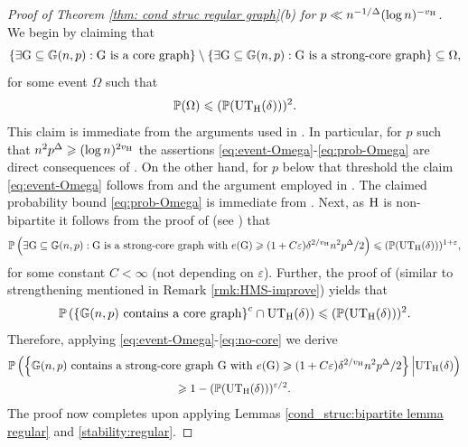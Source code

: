 \documentclass[a4paper,11pt,english,reqno]{amsart}
\numberwithin{equation}{section}
\renewcommand{\leq}{\leqslant}
\renewcommand{\geq}{\geqslant}
\newcommand{\UTH}{\textup{UT}_{\textup{H}}(\delta)}
\newcommand{\uH}{\textup{H}}
\renewcommand{\P}{\mathbb{P}}
\newcommand{\G}{\mathbb{G}}
\newcommand{\tu}[1]{\textup{#1}}
\begin{document}
\begin{proof}[Proof of Theorem \ref{thm: cond struc regular graph}(b) for $p \ll n^{-1/\Delta} (\log n)^{-v_{\uH}}$]
We begin by claiming that
\begin{equation}\label{eq:event-Omega}
	\left\{ \exists \tu{G} \subseteq \G(n,p): \tu{G} \text{ is a core graph} \right\}\setminus \left\{ \exists \tu{G} \subseteq \G(n,p): \tu{G} \text{ is a strong-core graph} \right\} \subseteq \Omega,
\end{equation}
for some event $\Omega$ such that 
\begin{equation}\label{eq:prob-Omega}
	\P(\Omega) \leq (\P(\UTH))^2.
\end{equation}
This claim is immediate from the arguments used in \cite[Sections 3.1--3.3]{ABRB}. In particular, for $p$ such that $n^2p^\Delta \geq (\log n)^{2 v_{\uH}}$ the assertions \eqref{eq:event-Omega}-\eqref{eq:prob-Omega} are direct consequences of \cite[Lemma 3.5]{ABRB}. On the other hand, for $p$ below that threshold the claim \eqref{eq:event-Omega} follows from \cite[Eqn.~(3.22)]{ABRB} and the argument employed in \cite[p.~32]{ABRB}. The claimed probability bound \eqref{eq:prob-Omega} is immediate from \cite[Lemmas 3.7, 3.8, 3.10, and 3.11]{ABRB}. Next, as $\uH$ is non-bipartite it follows from the proof of \cite[Proposition 3.3]{ABRB} (see \cite[Section 4.1]{ABRB}) that 
\begin{equation}\label{eq:sc-many-edge}
	\P\left(\exists \tu{G} \subseteq \G(n,p): \tu{G} \text{ is a strong-core graph with } e(\tu{G}) \geq (1+C \varepsilon)\delta^{2/v_{\uH}}n^2p^\Delta/2 \right) \leq (\P(\UTH))^{1+\varepsilon},
\end{equation}
for some constant $C < \infty$ (not depending on $\varepsilon$). Further, the proof of \cite[Lemma 3.2]{ABRB} (similar to strengthening mentioned in Remark \ref{rmk:HMS-improve}) yields that
\begin{equation}\label{eq:no-core}
	\P\left(\left\{\G(n,p) \text{ contains a core graph}\right\}^c \cap \UTH \right) \leq (\P(\UTH))^2. 
\end{equation}
Therefore, applying \eqref{eq:event-Omega}-\eqref{eq:no-core} we derive
\begin{multline*}
	\P\left(\left\{ \G(n,p) \text{ contains a strong-core graph } \tu{G}  \text{ with } e(\tu{G}) \geq (1+C \varepsilon)\delta^{2/v_{\uH}}n^2p^\Delta/2\right\}\Big| \UTH \right) \\
	\geq 1 - (\P(\UTH))^{\varepsilon/2}.
\end{multline*}
The proof now completes upon applying Lemmas \ref{cond_struc:bipartite lemma regular} and \ref{stability:regular}.
\end{proof}
\end{document}
